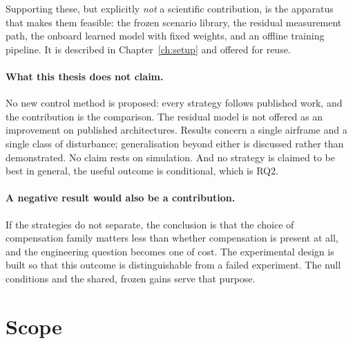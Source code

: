 Supporting these, but explicitly \emph{not} a scientific contribution, is the apparatus that makes
them feasible: the frozen scenario library, the residual measurement path, the onboard learned
model with fixed weights, and an offline training pipeline. It is described in
Chapter~\ref{ch:setup} and offered for reuse.

\paragraph{What this thesis does not claim.} No new control method is proposed: every strategy
follows published work, and the contribution is the comparison. The residual model is not offered
as an improvement on published architectures. Results concern a single airframe and a single class
of disturbance; generalisation beyond either is discussed rather than demonstrated. No claim rests
on simulation. And no
strategy is claimed to be best in general, the useful outcome is conditional, which is RQ2.

\paragraph{A negative result would also be a contribution.} If the strategies do not separate, the
conclusion is that the choice of compensation family matters less than whether compensation is
present at all, and the engineering question becomes one of cost. The experimental design is built so that this outcome is distinguishable from a failed experiment.
The null conditions and the shared, frozen gains serve that purpose.


\section{Scope}
\label{sec:intro-scope}

